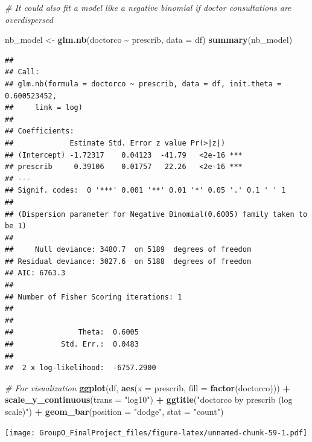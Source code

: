 \documentclass[
]{article}
\newenvironment{Shaded}{\begin{snugshade}}{\end{snugshade}}
\newcommand{\AttributeTok}[1]{\textcolor[rgb]{0.13,0.29,0.53}{#1}}
\newcommand{\CommentTok}[1]{\textcolor[rgb]{0.56,0.35,0.01}{\textit{#1}}}
\newcommand{\FunctionTok}[1]{\textcolor[rgb]{0.13,0.29,0.53}{\textbf{#1}}}
\newcommand{\NormalTok}[1]{#1}
\newcommand{\OtherTok}[1]{\textcolor[rgb]{0.56,0.35,0.01}{#1}}
\newcommand{\SpecialCharTok}[1]{\textcolor[rgb]{0.81,0.36,0.00}{\textbf{#1}}}
\newcommand{\StringTok}[1]{\textcolor[rgb]{0.31,0.60,0.02}{#1}}
\begin{document}
\begin{Shaded}
\begin{Highlighting}[]
\CommentTok{\# It could also fit a model like a negative binomial if doctor consultations are overdispersed}

\NormalTok{nb\_model }\OtherTok{\textless{}{-}} \FunctionTok{glm.nb}\NormalTok{(doctorco }\SpecialCharTok{\textasciitilde{}}\NormalTok{ prescrib, }\AttributeTok{data =}\NormalTok{ df)}
\FunctionTok{summary}\NormalTok{(nb\_model)}
\end{Highlighting}
\end{Shaded}

\begin{verbatim}
## 
## Call:
## glm.nb(formula = doctorco ~ prescrib, data = df, init.theta = 0.600523452, 
##     link = log)
## 
## Coefficients:
##             Estimate Std. Error z value Pr(>|z|)    
## (Intercept) -1.72317    0.04123  -41.79   <2e-16 ***
## prescrib     0.39106    0.01757   22.26   <2e-16 ***
## ---
## Signif. codes:  0 '***' 0.001 '**' 0.01 '*' 0.05 '.' 0.1 ' ' 1
## 
## (Dispersion parameter for Negative Binomial(0.6005) family taken to be 1)
## 
##     Null deviance: 3480.7  on 5189  degrees of freedom
## Residual deviance: 3027.6  on 5188  degrees of freedom
## AIC: 6763.3
## 
## Number of Fisher Scoring iterations: 1
## 
## 
##               Theta:  0.6005 
##           Std. Err.:  0.0483 
## 
##  2 x log-likelihood:  -6757.2900
\end{verbatim}

\begin{Shaded}
\begin{Highlighting}[]
\CommentTok{\# For visualization}
\FunctionTok{ggplot}\NormalTok{(df, }\FunctionTok{aes}\NormalTok{(}\AttributeTok{x =}\NormalTok{ prescrib, }\AttributeTok{fill =} \FunctionTok{factor}\NormalTok{(doctorco))) }\SpecialCharTok{+} 
  \FunctionTok{scale\_y\_continuous}\NormalTok{(}\AttributeTok{trans =} \StringTok{"log10"}\NormalTok{) }\SpecialCharTok{+}
  \FunctionTok{ggtitle}\NormalTok{(}\StringTok{"\textquotesingle{}doctorco\textquotesingle{} by \textquotesingle{}prescrib\textquotesingle{} (log scale)"}\NormalTok{) }\SpecialCharTok{+}
  \FunctionTok{geom\_bar}\NormalTok{(}\AttributeTok{position =} \StringTok{"dodge"}\NormalTok{, }\AttributeTok{stat =} \StringTok{"count"}\NormalTok{)}
\end{Highlighting}
\end{Shaded}

\texttt{[image: GroupO\_FinalProject\_files/figure-latex/unnamed-chunk-59-1.pdf]}
\end{document}
